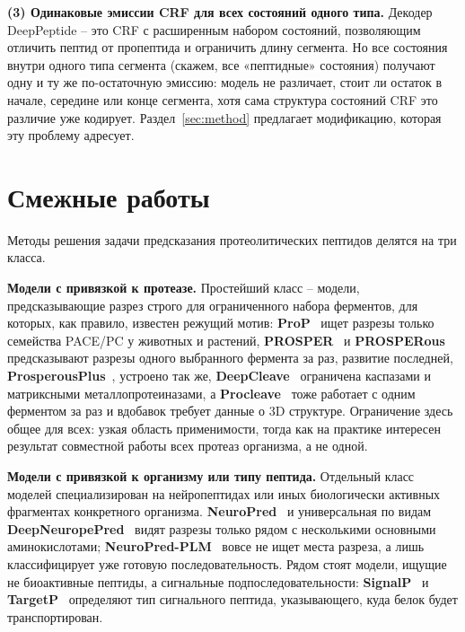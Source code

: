 \documentclass{article}
\begin{document}
\textbf{(3) Одинаковые эмиссии CRF для всех состояний одного типа.} Декодер DeepPeptide -- это CRF с расширенным набором состояний, позволяющим отличить пептид от пропептида и ограничить длину сегмента. Но все состояния внутри одного типа сегмента (скажем, все «пептидные» состояния) получают одну и ту же по-остаточную эмиссию: модель не различает, стоит ли остаток в начале, середине или конце сегмента, хотя сама структура состояний CRF это различие уже кодирует. Раздел~\ref{sec:method} предлагает модификацию, которая эту проблему адресует.

\section{Смежные работы}
\label{sec:related}

Методы решения задачи предсказания протеолитических пептидов делятся на три класса.

\textbf{Модели с привязкой к протеазе.} Простейший класс -- модели, предсказывающие разрез строго для ограниченного набора ферментов, для которых, как правило, известен режущий мотив: \textbf{ProP}~\cite{duckert2004prop} ищет разрезы только семейства PACE/PC у животных и растений, \textbf{PROSPER}~\cite{song2012prosper} и \textbf{PROSPERous}~\cite{song2018prosperous} предсказывают разрезы одного выбранного фермента за раз, развитие последней, \textbf{ProsperousPlus}~\cite{li2023prosperousplus}, устроено так же, \textbf{DeepCleave}~\cite{li2020deepcleave} ограничена каспазами и матриксными металлопротеиназами, а \textbf{Procleave}~\cite{li2020procleave} тоже работает с одним ферментом за раз и вдобавок требует данные о 3D структуре. Ограничение здесь общее для всех: узкая область применимости, тогда как на практике интересен результат совместной работы всех протеаз организма, а не одной.

\textbf{Модели с привязкой к организму или типу пептида.} Отдельный класс моделей специализирован на нейропептидах или иных биологически активных фрагментах конкретного организма. \textbf{NeuroPred}~\cite{southey2006neuropred} и универсальная по видам \textbf{DeepNeuropePred}~\cite{wang2024deepneuropepred} видят разрезы только рядом с несколькими основными аминокислотами; \textbf{NeuroPred-PLM}~\cite{wang2023neuropredplm} вовсе не ищет места разреза, а лишь классифицирует уже готовую последовательность. Рядом стоят модели, ищущие не биоактивные пептиды, а сигнальные подпоследовательности: \textbf{SignalP}~\cite{teufel2022signalp6} и \textbf{TargetP}~\cite{almagro2019targetp} определяют тип сигнального пептида, указывающего, куда белок будет транспортирован.
\end{document}
